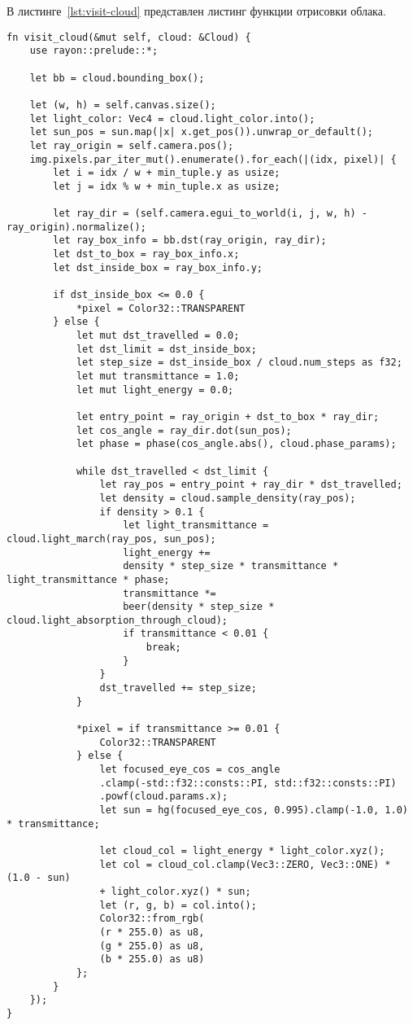 В листинге~\ref{lst:visit-cloud} представлен листинг функции отрисовки облака.
\begin{lstlisting}[style=rust, caption={Фунция отрисовки облака},label={lst:visit-cloud}]
fn visit_cloud(&mut self, cloud: &Cloud) {
	use rayon::prelude::*;
	
	let bb = cloud.bounding_box();
	
	let (w, h) = self.canvas.size();
	let light_color: Vec4 = cloud.light_color.into();
	let sun_pos = sun.map(|x| x.get_pos()).unwrap_or_default();
	let ray_origin = self.camera.pos();
	img.pixels.par_iter_mut().enumerate().for_each(|(idx, pixel)| {
		let i = idx / w + min_tuple.y as usize;
		let j = idx % w + min_tuple.x as usize;
		
		let ray_dir = (self.camera.egui_to_world(i, j, w, h) - ray_origin).normalize();
		let ray_box_info = bb.dst(ray_origin, ray_dir);
		let dst_to_box = ray_box_info.x;
		let dst_inside_box = ray_box_info.y;
		
		if dst_inside_box <= 0.0 {
			*pixel = Color32::TRANSPARENT
		} else {
			let mut dst_travelled = 0.0;
			let dst_limit = dst_inside_box;
			let step_size = dst_inside_box / cloud.num_steps as f32;
			let mut transmittance = 1.0;
			let mut light_energy = 0.0;
			
			let entry_point = ray_origin + dst_to_box * ray_dir;
			let cos_angle = ray_dir.dot(sun_pos);
			let phase = phase(cos_angle.abs(), cloud.phase_params);
			
			while dst_travelled < dst_limit {
				let ray_pos = entry_point + ray_dir * dst_travelled;
				let density = cloud.sample_density(ray_pos);
				if density > 0.1 {
					let light_transmittance = cloud.light_march(ray_pos, sun_pos);
					light_energy +=
					density * step_size * transmittance * light_transmittance * phase;
					transmittance *=
					beer(density * step_size * cloud.light_absorption_through_cloud);
					if transmittance < 0.01 {
						break;
					}
				}
				dst_travelled += step_size;
			}
			
			*pixel = if transmittance >= 0.01 {
				Color32::TRANSPARENT
			} else {
				let focused_eye_cos = cos_angle
				.clamp(-std::f32::consts::PI, std::f32::consts::PI)
				.powf(cloud.params.x);
				let sun = hg(focused_eye_cos, 0.995).clamp(-1.0, 1.0) * transmittance;
				
				let cloud_col = light_energy * light_color.xyz();
				let col = cloud_col.clamp(Vec3::ZERO, Vec3::ONE) * (1.0 - sun)
				+ light_color.xyz() * sun;
				let (r, g, b) = col.into();
				Color32::from_rgb(
				(r * 255.0) as u8,
				(g * 255.0) as u8,
				(b * 255.0) as u8)
			};
		}
	});
}
\end{lstlisting}
